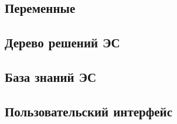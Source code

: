 \subsection{Переменные}

\subsection{Дерево решений ЭС}

\subsection{База знаний ЭС}

\subsection{Пользовательский интерфейс}

\newpage





